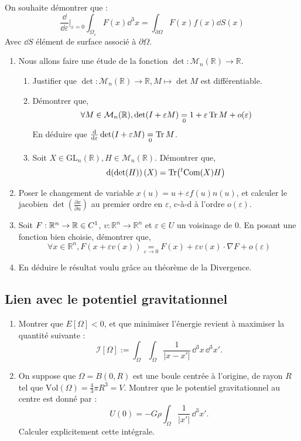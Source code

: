 \documentclass[a4paper,10pt]{report}
\newcommand{\diff}[1]{\frac{\dd}{\dd #1}}
\newcommand{\RR}{\mathbb{R}}
\begin{document}
	On souhaite démontrer que :
	\[
	\diff{\varepsilon}|_{\varepsilon = 0} \int_{\Omega_\varepsilon} F(x) \dd^3 x = \int_{\partial \Omega} F(x) f(x) \dd S(x) \label{eq:Had}
	\]
Avec $\dd S$ élément de surface associé à $\partial \Omega$.
	\begin{enumerate}
		\item Nous allons faire une étude de la fonction $\det : \mathcal M_n(\RR) \to \RR$.
		\begin{enumerate}
			\item Justifier que $\det: \mathcal M_n(\RR) \to \RR, M \mapsto \det M$ est différentiable.
			\item Démontrer que, $$\forall M \in \mathcal M_n(\RR),\det(I + \varepsilon M) \underset{0}{=} 1 + \varepsilon \Tr M + o(\varepsilon)$$
			En déduire que $\diff \varepsilon \det(I + \varepsilon M) \underset{0}{=} \Tr M$.
			\item Soit $X \in \text{GL}_n(\RR), H \in \mathcal M_n(\RR)$. Démontrer que,$$\dd(\det(H))(X) = \Tr(^t\text{Com}(X) H)$$
		\end{enumerate}
		\item Poser le changement de variable $x(u) = u + \varepsilon f(u) n(u)$, et calculer le jacobien $\det(\frac{\partial x}{\partial u})$ au premier ordre en $\varepsilon$, c-à-d à l'ordre $o(\varepsilon)$.

		\item Soit $F : \RR^n \to \RR \in \mathcal \mathcal{C}^1$, $v : \RR^n \to \RR^n$ et $\varepsilon \in U$ un voisinage de $0$.
		En posant une fonction bien choisie, démontrer que,
		\[\forall x \in \RR^n, F(x+\varepsilon v(x)) \underset{\varepsilon \to 0}{=}
		 F(x) + \varepsilon v(x) \cdot \nabla F + o(\varepsilon)\]
	 \item En déduire le résultat voulu grâce au théorème de la Divergence.
	 	\end{enumerate}
	 	\subsection{Lien avec le potentiel gravitationnel}
	 	
	 	\begin{enumerate}
	 		\item Montrer que \( E[\Omega] < 0 \), et que minimiser l’énergie revient à maximiser la quantité suivante :
	 		\[
	 		\mathcal{I}[\Omega] := \int_{\Omega} \int_{\Omega} \frac{1}{|x -  {x}'|} \,  \dd^3x \,  \dd^3x'.
	 		\]
	 		
	 		\item On suppose que \( \Omega = B(0,R) \) est une boule centrée à l’origine, de rayon \( R \) tel que \( \mathrm{Vol}(\Omega) = \frac{4}{3} \pi R^3 = V \). Montrer que le potentiel gravitationnel au centre est donné par :
	 		\[
	 		U(0) = -G \rho \int_{\Omega} \frac{1}{| {x}'|} \,  \dd^3x'.
	 		\]
	 		Calculer explicitement cette intégrale.
	 		
	 	\end{enumerate}
	 	
\end{document}

